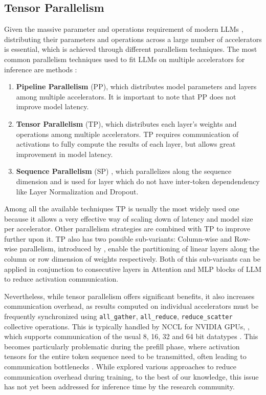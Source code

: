 \subsection{Tensor Parallelism}
Given the massive parameter and operations requirement of modern LLMs \parencite{llama3, llmsurvey}, distributing their parameters and operations across a large number of accelerators is essential, which is achieved through different parallelism techniques. The most common parallelism techniques used to fit LLMs on multiple accelerators for inference are methods \parencite{megatron, reducingactivationrecomputation, zero, optimizingcommunication}: 
\begin{enumerate}
\item \textbf{Pipeline Parallelism} (PP), which distributes model parameters and layers among multiple accelerators. It is important to note that PP does not improve model latency.
\item \textbf{Tensor Parallelism} (TP), which distributes each layer's weights and operations among multiple accelerators. TP requires communication of activations to fully compute the results of each layer, but allows great improvement in model latency.
\item \textbf{Sequence Parallelism} (SP) \parencite{reducingactivationrecomputation}, which parallelizes along the sequence dimension and is used for layer which do not have inter-token dependendency like Layer Normalization and Dropout.
\end{enumerate}

Among all the available techniques TP is usually the most widely used one because it allows a very effective way of scaling down of latency and model size per accelerator. Other parallelism strategies are combined with TP to improve further upon it. TP also has two possible sub-variants: Column-wise and Row-wise parallelism, introduced by \cite{megatron} , enable the partitioning of linear layers along the column or row dimension of weights respectively. Both of this sub-variants can be applied in conjunction to consecutive layers in Attention and MLP blocks of LLM to reduce activation communication.

Nevertheless, while tensor parallelism offers significant benefits, it also increases communication overhead, as results computed on individual accelerators must be frequently synchronized using \verb|all_gather|, \verb|all_reduce|, \verb|reduce_scatter| collective operations. This is typically handled by NCCL for NVIDIA GPUs, \cite{mpimessagepassinginterfacestandard}, which supports communication of the usual 8, 16, 32 and 64 bit datatypes \parencite{nccl}. This becomes particularly problematic during the prefill phase, where activation tensors for the entire token sequence need to be transmitted, often leading to communication bottlenecks \parencite{optimizingcommunication, mnemosyne}. While \cite{tpcompression} explored various approaches to reduce communication overhead during training, to the best of our knowledge, this issue has not yet been addressed for inference time by the research community.


